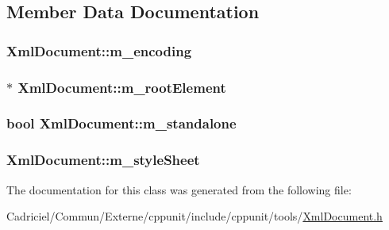 \subsection{Member Data Documentation}
\hypertarget{class_xml_document_a3a5338a6b02b176a3d50e6665ce1b41d}{
\subsubsection[{m\-\_\-encoding}]{ Xml\-Document\-::m\-\_\-encoding\hspace{0.3cm}{\ttfamily [protected]}}}\label{class_xml_document_a3a5338a6b02b176a3d50e6665ce1b41d}
\hypertarget{class_xml_document_a83e49d668c247017d1681a9989958280}{
\subsubsection[{m\-\_\-root\-Element}]{$\ast$ Xml\-Document\-::m\-\_\-root\-Element\hspace{0.3cm}{\ttfamily [protected]}}}\label{class_xml_document_a83e49d668c247017d1681a9989958280}
\hypertarget{class_xml_document_a0c2dd2a48772ad62209a268156af3baa}{
\subsubsection[{m\-\_\-standalone}]{\setlength{\rightskip}{0pt plus 5cm}bool Xml\-Document\-::m\-\_\-standalone\hspace{0.3cm}{\ttfamily [protected]}}}\label{class_xml_document_a0c2dd2a48772ad62209a268156af3baa}
\hypertarget{class_xml_document_a8564bf7c7d4856e6aecc2d7b7be6782b}{
\subsubsection[{m\-\_\-style\-Sheet}]{ Xml\-Document\-::m\-\_\-style\-Sheet\hspace{0.3cm}{\ttfamily [protected]}}}\label{class_xml_document_a8564bf7c7d4856e6aecc2d7b7be6782b}


The documentation for this class was generated from the following file\-:\begin{DoxyCompactItemize}
\item 
Cadriciel/\-Commun/\-Externe/cppunit/include/cppunit/tools/\hyperlink{_xml_document_8h}{Xml\-Document.\-h}\end{DoxyCompactItemize}
